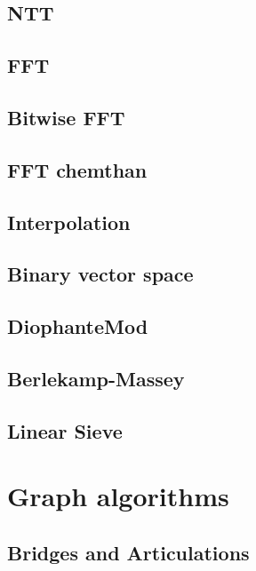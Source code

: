 \subsection{NTT}
\raggedbottom
\hrulefill
\subsection{FFT}
\raggedbottom
\hrulefill
\subsection{Bitwise FFT}
\raggedbottom
\hrulefill
\subsection{FFT chemthan}
\raggedbottom
\hrulefill
\subsection{Interpolation}
\raggedbottom
\hrulefill
\subsection{Binary vector space}
\raggedbottom
\hrulefill
\subsection{DiophanteMod}
\raggedbottom
\hrulefill
\subsection{Berlekamp-Massey}
\raggedbottom
\hrulefill
\subsection{Linear Sieve}
\raggedbottom
\hrulefill

\section{Graph algorithms}
\subsection{Bridges and Articulations}
\raggedbottom
\hrulefill
